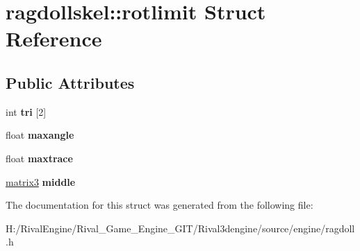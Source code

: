 \hypertarget{structragdollskel_1_1rotlimit}{}\section{ragdollskel\+:\+:rotlimit Struct Reference}
\label{structragdollskel_1_1rotlimit}
\subsection*{Public Attributes}
\begin{DoxyCompactItemize}
\item 
\mbox{\label{structragdollskel_1_1rotlimit_a10ad981697009c3f8157bcb22395c669}} 
int {\bfseries tri} \mbox{[}2\mbox{]}
\item 
\mbox{\label{structragdollskel_1_1rotlimit_a6aae6e5b6684f6d3a9f9db5f2b329f1a}} 
float {\bfseries maxangle}
\item 
\mbox{\label{structragdollskel_1_1rotlimit_a484f64d6640cbacb38b311ae1e9470d4}} 
float {\bfseries maxtrace}
\item 
\mbox{\label{structragdollskel_1_1rotlimit_a9439af681d86805edc73bb8ced3ff9e3}} 
\hyperlink{structmatrix3}{matrix3} {\bfseries middle}
\end{DoxyCompactItemize}


The documentation for this struct was generated from the following file\+:\begin{DoxyCompactItemize}
\item 
H\+:/\+Rival\+Engine/\+Rival\+\_\+\+Game\+\_\+\+Engine\+\_\+\+G\+I\+T/\+Rival3dengine/source/engine/ragdoll.\+h\end{DoxyCompactItemize}

